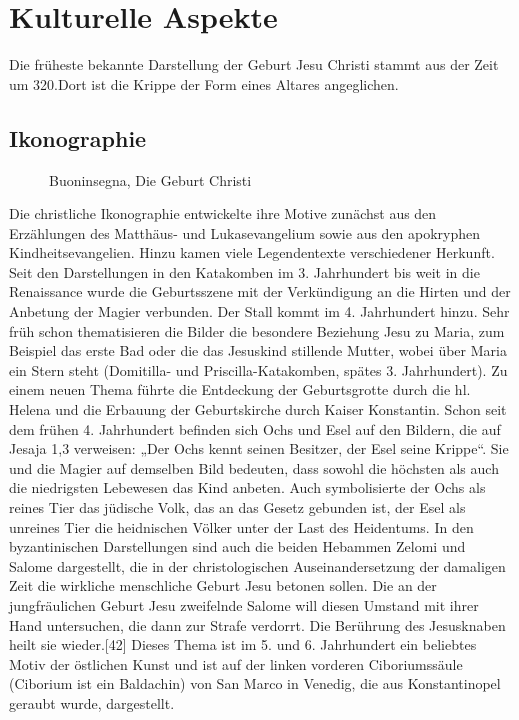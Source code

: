
\chapter{Kulturelle Aspekte}
\label{chapter-Kulturelle Aspekte}

Die früheste bekannte Darstellung der Geburt Jesu Christi stammt aus der Zeit um 320.Dort ist die Krippe der Form eines Altares angeglichen.

\section{Ikonographie}

\begin{figure}
  \centering
  \caption[Abbildung 2.Buoninsegna ]{ Buoninsegna, Die Geburt Christi}
  \label{Buoninsegna}
\end{figure}

Die christliche Ikonographie entwickelte ihre Motive zunächst aus den Erzählungen des Matthäus- und Lukasevangelium sowie aus den apokryphen Kindheitsevangelien. Hinzu kamen viele Legendentexte verschiedener Herkunft. Seit den Darstellungen in den Katakomben im 3. Jahrhundert bis weit in die Renaissance wurde die Geburtsszene mit der Verkündigung an die Hirten und der Anbetung der Magier verbunden. Der Stall kommt im 4. Jahrhundert hinzu. Sehr früh schon thematisieren die Bilder die besondere Beziehung Jesu zu Maria, zum Beispiel das erste Bad oder die das Jesuskind stillende Mutter, wobei über Maria ein Stern steht (Domitilla- und Priscilla-Katakomben, spätes 3. Jahrhundert). Zu einem neuen Thema führte die Entdeckung der Geburtsgrotte durch die hl. Helena und die Erbauung der Geburtskirche durch Kaiser Konstantin. Schon seit dem frühen 4. Jahrhundert befinden sich Ochs und Esel auf den Bildern, die auf Jesaja 1,3 verweisen: „Der Ochs kennt seinen Besitzer, der Esel seine Krippe“. Sie und die Magier auf demselben Bild bedeuten, dass sowohl die höchsten als auch die niedrigsten Lebewesen das Kind anbeten. Auch symbolisierte der Ochs als reines Tier das jüdische Volk, das an das Gesetz gebunden ist, der Esel als unreines Tier die heidnischen Völker unter der Last des Heidentums. In den byzantinischen Darstellungen sind auch die beiden Hebammen Zelomi und Salome dargestellt, die in der christologischen Auseinandersetzung der damaligen Zeit die wirkliche menschliche Geburt Jesu betonen sollen. Die an der jungfräulichen Geburt Jesu zweifelnde Salome will diesen Umstand mit ihrer Hand untersuchen, die dann zur Strafe verdorrt. Die Berührung des Jesusknaben heilt sie wieder.[42] Dieses Thema ist im 5. und 6. Jahrhundert ein beliebtes Motiv der östlichen Kunst und ist auf der linken vorderen Ciboriumssäule (Ciborium ist ein Baldachin) von San Marco in Venedig, die aus Konstantinopel geraubt wurde, dargestellt.


